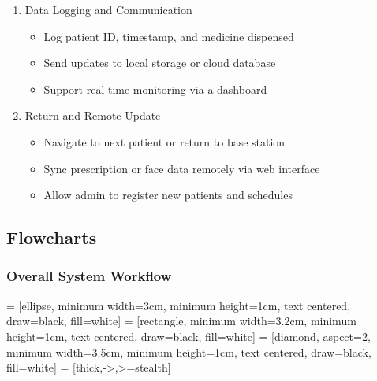 \begin{enumerate}
    \item Data Logging and Communication
    \begin{itemize}
        \item Log patient ID, timestamp, and medicine dispensed
        \item Send updates to local storage or cloud database
        \item Support real-time monitoring via a dashboard
    \end{itemize}

    \item Return and Remote Update
    \begin{itemize}
        \item Navigate to next patient or return to base station
        \item Sync prescription or face data remotely via web interface
        \item Allow admin to register new patients and schedules
    \end{itemize}
\end{enumerate}

\vspace{1.5\baselineskip}
\newpage
\subsection{Flowcharts}

\subsubsection{Overall System Workflow}

 = [ellipse, minimum width=3cm, minimum height=1cm, text centered, draw=black, fill=white]
 = [rectangle, minimum width=3.2cm, minimum height=1cm, text centered, draw=black, fill=white]
 = [diamond, aspect=2, minimum width=3.5cm, minimum height=1cm, text centered, draw=black, fill=white]
 = [thick,->,>=stealth]

